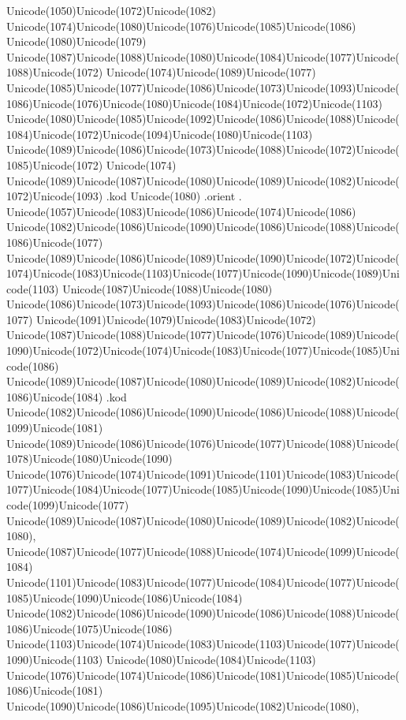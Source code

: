 \documentclass[a4paper,11pt]{report}
\begin{document}
{{\begin{Verbatim}[commandchars=!@|,fontsize=\small,frame=single,label=Пример]
\end{Verbatim}
 Unicode(1050)Unicode(1072)Unicode(1082)
Unicode(1074)Unicode(1080)Unicode(1076)Unicode(1085)Unicode(1086)
Unicode(1080)Unicode(1079)
Unicode(1087)Unicode(1088)Unicode(1080)Unicode(1084)Unicode(1077)Unicode(1088)Unicode(1072)
Unicode(1074)Unicode(1089)Unicode(1077)
Unicode(1085)Unicode(1077)Unicode(1086)Unicode(1073)Unicode(1093)Unicode(1086)Unicode(1076)Unicode(1080)Unicode(1084)Unicode(1072)Unicode(1103)
Unicode(1080)Unicode(1085)Unicode(1092)Unicode(1086)Unicode(1088)Unicode(1084)Unicode(1072)Unicode(1094)Unicode(1080)Unicode(1103)
Unicode(1089)Unicode(1086)Unicode(1073)Unicode(1088)Unicode(1072)Unicode(1085)Unicode(1072)
Unicode(1074)
Unicode(1089)Unicode(1087)Unicode(1080)Unicode(1089)Unicode(1082)Unicode(1072)Unicode(1093)
.kod Unicode(1080) .orient .
Unicode(1057)Unicode(1083)Unicode(1086)Unicode(1074)Unicode(1086)
Unicode(1082)Unicode(1086)Unicode(1090)Unicode(1086)Unicode(1088)Unicode(1086)Unicode(1077)
Unicode(1089)Unicode(1086)Unicode(1089)Unicode(1090)Unicode(1072)Unicode(1074)Unicode(1083)Unicode(1103)Unicode(1077)Unicode(1090)Unicode(1089)Unicode(1103)
Unicode(1087)Unicode(1088)Unicode(1080)
Unicode(1086)Unicode(1073)Unicode(1093)Unicode(1086)Unicode(1076)Unicode(1077)
Unicode(1091)Unicode(1079)Unicode(1083)Unicode(1072)
Unicode(1087)Unicode(1088)Unicode(1077)Unicode(1076)Unicode(1089)Unicode(1090)Unicode(1072)Unicode(1074)Unicode(1083)Unicode(1077)Unicode(1085)Unicode(1086)
Unicode(1089)Unicode(1087)Unicode(1080)Unicode(1089)Unicode(1082)Unicode(1086)Unicode(1084)
.kod
Unicode(1082)Unicode(1086)Unicode(1090)Unicode(1086)Unicode(1088)Unicode(1099)Unicode(1081)
Unicode(1089)Unicode(1086)Unicode(1076)Unicode(1077)Unicode(1088)Unicode(1078)Unicode(1080)Unicode(1090)
Unicode(1076)Unicode(1074)Unicode(1091)Unicode(1101)Unicode(1083)Unicode(1077)Unicode(1084)Unicode(1077)Unicode(1085)Unicode(1090)Unicode(1085)Unicode(1099)Unicode(1077)
Unicode(1089)Unicode(1087)Unicode(1080)Unicode(1089)Unicode(1082)Unicode(1080),
Unicode(1087)Unicode(1077)Unicode(1088)Unicode(1074)Unicode(1099)Unicode(1084)
Unicode(1101)Unicode(1083)Unicode(1077)Unicode(1084)Unicode(1077)Unicode(1085)Unicode(1090)Unicode(1086)Unicode(1084)
Unicode(1082)Unicode(1086)Unicode(1090)Unicode(1086)Unicode(1088)Unicode(1086)Unicode(1075)Unicode(1086)
Unicode(1103)Unicode(1074)Unicode(1083)Unicode(1103)Unicode(1077)Unicode(1090)Unicode(1103)
Unicode(1080)Unicode(1084)Unicode(1103)
Unicode(1076)Unicode(1074)Unicode(1086)Unicode(1081)Unicode(1085)Unicode(1086)Unicode(1081)
Unicode(1090)Unicode(1086)Unicode(1095)Unicode(1082)Unicode(1080),
}}
\end{document}

